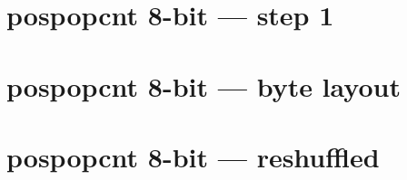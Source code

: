 \documentclass{article}
\begin{document}
\section{pospopcnt 8-bit --- step 1}


\section{pospopcnt 8-bit --- byte layout}


\section{pospopcnt 8-bit --- reshuffled}

\end{document}
